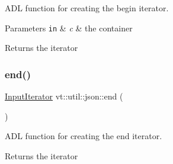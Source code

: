 A\+DL function for creating the begin iterator. 


\begin{DoxyParams}[1]{Parameters}
\mbox{\tt in}  & {\em c} & the container\\
\hline
\end{DoxyParams}
\begin{DoxyReturn}{Returns}
the iterator 
\end{DoxyReturn}
\mbox{\label{namespacevt_1_1util_1_1json_a6f1b13d9471c62e046731666abd9c5ed}} 
\subsubsection{\texorpdfstring{end()}{end()}}
{\footnotesize\ttfamily \hyperlink{structvt_1_1util_1_1json_1_1_input_iterator}{Input\+Iterator} vt\+::util\+::json\+::end (\begin{DoxyParamCaption}\item[{\hyperlink{structvt_1_1util_1_1json_1_1_decompression_input_container}{Decompression\+Input\+Container} const \&}]{ }\end{DoxyParamCaption})\hspace{0.3cm}{\ttfamily [inline]}}



A\+DL function for creating the end iterator. 

\begin{DoxyReturn}{Returns}
the iterator 
\end{DoxyReturn}
